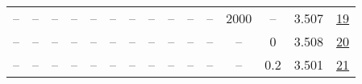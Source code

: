 \begin{table}[H]
\begin{tabular}{ccccccccccccccc}
-- & -- & -- & -- & -- & -- & -- & -- & -- & -- & -- & 2000 & -- & 3.507 & \href{https://wandb.ai/stanford-mercury/optimizer-scaling/runs/sweep-130m-2B-soapla7e9f5lr0.016-wd0.1-minlr0-warmup2000-b10.95--e1c5c4}{19} \\
-- & -- & -- & -- & -- & -- & -- & -- & -- & -- & -- & -- & 0 & 3.508 & \href{https://wandb.ai/stanford-mercury/optimizer-scaling/runs/sweep-130m-2B-soapl222613lr0.016-wd0-minlr0-warmup1000-b10.95-b2-cae71c}{20} \\
-- & -- & -- & -- & -- & -- & -- & -- & -- & -- & -- & -- & 0.2 & 3.501 & \href{https://wandb.ai/stanford-mercury/optimizer-scaling/runs/sweep-130m-2B-soapl3db00flr0.016-wd0.2-minlr0-warmup1000-b10.95--173d5a}{21} \\
\bottomrule
\end{tabular}
\end{table}

